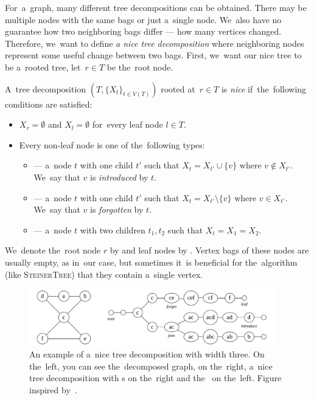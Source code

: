 For~a~graph, many different tree decompositions can be obtained.
There may be multiple nodes with the same bags or just a~single node.
We~also have no guarantee how two neighboring bags differ --- how many vertices changed.
Therefore, we~want to define \emph{a nice tree decomposition} where neighboring nodes
represent some useful change between two bags.
First, we~want our nice tree to be a~rooted tree,
let~\( r \in T \) be the~root node.
%
\begin{definition}
	A~tree decomposition \newline
	\( (T, {\{X_t\}}_{t \in V ( T )}) \) rooted at~\( r \in T \)
	is \emph{nice} if~the~following conditions are satisfied:
	\begin{itemize}
		\item \( X_r = \emptyset \) and \( X_l = \emptyset \) for~every leaf node \( l \in T \).
		\item Every non-leaf node is one of the~following types:
		      \begin{itemize}
			      \item \IntroduceVertexNode{} --- a~node \( t \) with one child \( t' \)
			            such that \( X_t = X_{t'} \cup \{v\} \) where \( v \not\in X_{t'} \).
			            We~say that \( v \) is \emph{introduced} by \( t \).
			      \item \ForgetVertexNode{} --- a~node \( t \) with one child \( t' \)
			            such that \( X_t = X_{t'} \setminus \{v\} \) where \( v \in X_{t'} \).
			            We~say that \( v \) is \emph{forgotten} by \( t \).
			      \item \JoinNode{} --- a~node \( t \) with two children \( t_1, t_2 \)
			            such that \( X_t = X_1 = X_2 \).
		      \end{itemize}
	\end{itemize}
	We~denote the~root node \( r \) by \RootNode{} and leaf nodes by \LeafNode{}.
	Vertex bags of these nodes are usually empty, as in~our case,
	but sometimes it~is beneficial
	for the~algorithm (like \textsc{SteinerTree}) that they contain a~single vertex.
\end{definition}
%
\begin{figure}[ht]
	\begin{center}
		\includegraphics[width=0.95\textwidth]{./assets/nice_tree_decomposition}
	\end{center}
	\caption[Nice tree decomposition]{
		An example of a~nice tree decomposition with width three.
		On the~left, you can see the~decomposed graph,
		on the~right, a~nice tree decomposition
		with \LeafNode{}s on the~right and the~\RootNode{} on the~left.
		Figure inspired by~\cite{nice_tree_decomposition_img}.
	}%
	\label{fig:nice_tree_decomposition}
\end{figure}

